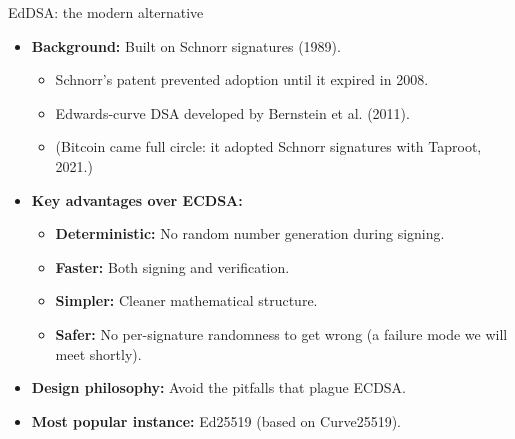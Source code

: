 \ifdefined\PRESENTATION\else\PassOptionsToClass{handout}{beamer}\fi\documentclass[aspectratio=169, lualatex]{beamer}
\begin{document}
\begin{frame}{EdDSA: the modern alternative}
	\begin{itemize}
		\item \textbf{Background:} Built on Schnorr signatures (1989).
		      \begin{itemize}
			      \item Schnorr's patent prevented adoption until it expired in 2008.
			      \item Edwards-curve DSA developed by Bernstein et al. (2011).
			      \item (Bitcoin came full circle: it adopted Schnorr signatures with Taproot, 2021.)
		      \end{itemize}
		\item \textbf{Key advantages over ECDSA:}
		      \begin{itemize}
			      \item \textbf{Deterministic:} No random number generation during signing.
			      \item \textbf{Faster:} Both signing and verification.
			      \item \textbf{Simpler:} Cleaner mathematical structure.
			      \item \textbf{Safer:} No per-signature randomness to get wrong (a failure mode we will meet shortly).
		      \end{itemize}
		\item \textbf{Design philosophy:} Avoid the pitfalls that plague ECDSA.
		\item \textbf{Most popular instance:} Ed25519 (based on Curve25519).
	\end{itemize}
\end{frame}
\end{document}
